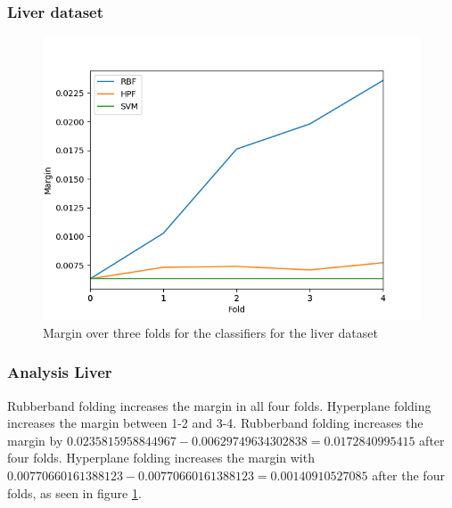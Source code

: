 \documentclass[a4paper,twoside]{bth}
\begin{document}
\subsubsection{Liver dataset}
\begin{figure}[!htb]
\centering
\includegraphics[scale=0.7]{images/result-liver/Margin.png}
   \caption{Margin over three folds for the classifiers for the liver dataset}
   \label{fig:liver-margin}
\end{figure}

\FloatBarrier

\subsubsection{Analysis Liver}
Rubberband folding increases the margin in all four folds. Hyperplane folding increases the margin between 1-2 and 3-4. Rubberband folding increases the margin by $0.0235815958844967 - 0.00629749634302838 = 0.0172840995415$ after four folds. Hyperplane folding increases the margin with $0.00770660161388123 - 0.00770660161388123 =  0.00140910527085$ after the four folds, as seen in figure \ref{fig:liver-margin}.


\clearpage
\FloatBarrier
\end{document}
